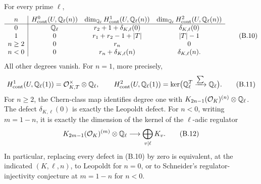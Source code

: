 \begin{theorem}
\label{thm:B-full-tate}
For every prime \(\ell\),
\[
\begin{array}{c|ccc}
n&H^0_{\mathrm{cont}}(U,\mathbb Q_\ell(n))&
\dim_{\mathbb Q_\ell}H^1_{\mathrm{cont}}(U,\mathbb Q_\ell(n))&
\dim_{\mathbb Q_\ell}H^2_{\mathrm{cont}}(U,\mathbb Q_\ell(n))\\ \hline
0&\mathbb Q_\ell&r_2+1+\delta_{K,\ell}(0)&\delta_{K,\ell}(0)\\
1&0&r_1+r_2-1+|T|&|T|-1\\
n\ge2&0&r_n&0\\
n<0&0&r_n+\delta_{K,\ell}(n)&\delta_{K,\ell}(n).
\end{array}\tag{B.10}
\]
All other degrees vanish.  For \(n=1\), more precisely,
\[
 H^1_{\mathrm{cont}}(U,\mathbb Q_\ell(1))=
 \mathcal O_{K,T}^\times\otimes\mathbb Q_\ell,\qquad
 H^2_{\mathrm{cont}}(U,\mathbb Q_\ell(1))=
 \ker\bigl(\mathbb Q_\ell^T\xrightarrow{\sum}\mathbb Q_\ell\bigr).
 \tag{B.11}
\]
For \(n\ge2\), the Chern-class map identifies degree one with
\(K_{2n-1}(\mathcal O_K)^{(n)}\otimes\mathbb Q_\ell\).
The defect \(\delta_{K,\ell}(0)\) is exactly the Leopoldt defect.
For \(n<0\), writing \(m=1-n\), it is exactly the dimension of
the kernel of the \(\ell\)-adic regulator
\[
 K_{2m-1}(\mathcal O_K)^{(m)}\otimes\mathbb Q_\ell
 \longrightarrow\bigoplus_{v\mid\ell}K_v .\tag{B.12}
\]
In particular, replacing every defect in (B.10) by zero is equivalent,
at the indicated \((K,\ell,n)\), to Leopoldt for \(n=0\), or to
Schneider's regulator-injectivity conjecture at \(m=1-n\) for \(n<0\).
\end{theorem}
